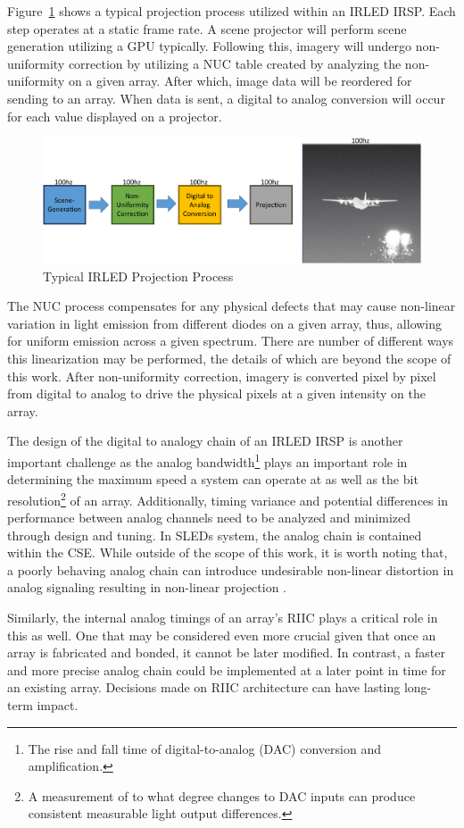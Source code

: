 Figure~\ref{fig:typical_projection} shows a typical projection process utilized within an IRLED IRSP. Each step operates at a static frame rate. A scene projector will perform scene generation utilizing a GPU typically. Following this, imagery will undergo non-uniformity correction by utilizing a NUC table created by analyzing the non-uniformity on a given array. After which, image data will be reordered for sending to an array. When data is sent, a digital to analog conversion will occur for each value displayed on a projector.

\begin{figure}
    \centering
    \includegraphics[width=1.0\textwidth]{fig/typical_projection_system.pdf}
    \caption{Typical IRLED Projection Process}
    \label{fig:typical_projection}
\end{figure}

The NUC process compensates for any physical defects that may cause non-linear variation in light emission from different diodes on a given array, thus, allowing for uniform emission across a given spectrum. There are number of different ways this linearization may be performed\cite{BrowningEtAl2016, LandwehrEtAl2017, BarakhshanEtAl2018_2, BarakhshanEtAl2019, BarakhshanEtAl2019_2}, the details of which are beyond the scope of this work. After non-uniformity correction, imagery is converted pixel by pixel from digital to analog to drive the physical pixels at a given intensity on the array.

The design of the digital to analogy chain of an IRLED IRSP is another important challenge as the analog bandwidth\footnote{The rise and fall time of digital-to-analog (DAC) conversion and amplification.} plays an important role in determining the maximum speed a system can operate at as well as the bit resolution\footnote{A measurement of to what degree changes to DAC inputs can produce consistent measurable light output differences.} of an array\cite{EjzakEtAl2019}. Additionally, timing variance and potential differences in performance between analog channels need to be analyzed and minimized through design and tuning. In SLEDs system, the analog chain is contained within the CSE. While outside of the scope of this work, it is worth noting that, a poorly behaving analog chain can introduce undesirable non-linear distortion in analog signaling resulting in non-linear projection \cite{Freeman1977, Gordon1978, ChanEtAl2008}.

Similarly, the internal analog timings of an array's RIIC plays a critical role in this as well. One that may be considered even more crucial given that once an array is fabricated and bonded, it cannot be later modified. In contrast, a faster and more precise analog chain could be implemented at a later point in time for an existing array. Decisions made on RIIC architecture can have lasting long-term impact.
